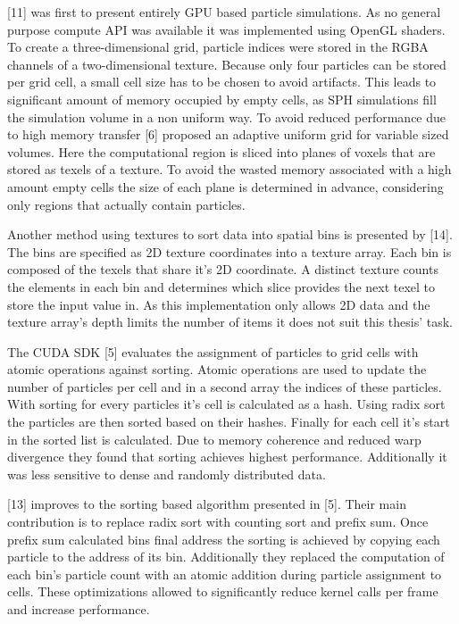 \documentclass[hyperref,german,diplominf]{cgvpub}
\begin{document}
[11] was first to present entirely GPU based particle simulations. As no general purpose compute API was available it was implemented using OpenGL shaders. To create a three-dimensional grid, particle indices were stored in the RGBA channels of a two-dimensional texture. Because only four particles can be stored per grid cell, a small cell size has to be chosen to avoid artifacts. This leads to significant amount of memory occupied by empty cells, as SPH simulations fill the simulation volume in a non uniform way. To avoid reduced performance due to high memory transfer [6] proposed an adaptive uniform grid for variable sized volumes. Here the computational region is sliced into planes of voxels that are stored as texels of a texture. To avoid the wasted memory associated with a high amount empty cells the size of each plane is determined in advance, considering only regions that actually contain particles.

Another method using textures to sort data into spatial bins is presented by [14]. The bins are specified as 2D texture coordinates into a texture array.
Each bin is composed of the texels that share it's 2D coordinate. A distinct texture counts the elements in each bin and determines which slice provides the next texel to store the input value in. As this implementation only allows 2D data and the texture array's depth limits the number of items it does not suit this thesis' task.

The CUDA SDK [5] evaluates the assignment of particles to grid cells with atomic operations against sorting. Atomic operations are used to update the number of particles per cell and in a second array the indices of these particles. With sorting for every particles it's cell is calculated as a hash. Using radix sort the particles are then sorted based on their hashes. Finally for each cell it's start in the sorted list is calculated. Due to memory coherence and reduced warp divergence they found that sorting achieves highest performance. Additionally it was less sensitive to dense and randomly distributed data.

[13] improves to the sorting based algorithm presented in [5].
Their main contribution is to replace radix sort with counting sort and prefix sum. Once prefix sum calculated bins final address the sorting is achieved by copying each particle to the address of its bin. Additionally they replaced the computation of each bin's particle count with an atomic addition during particle assignment to cells. These optimizations allowed to significantly reduce kernel calls per frame and increase performance.
\end{document}
